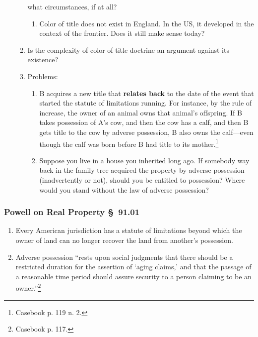 \begin{enumerate}
\begin{enumerate}
        what circumstances, if at all?
        \begin{enumerate}
            \item Color of title does not exist in England. In the US, it 
            developed in the context of the frontier. Does it still make sense 
            today?
        \end{enumerate}
        \item Is the complexity of color of title doctrine an argument against 
        its existence?
        \item Problems:
        \begin{enumerate}
            \item B acquires a new title that \textbf{relates back} to the date of 
            the event that started the statute of limitations running. For 
            instance, by the rule of increase, the owner of an animal owns that 
            animal's offspring.  If B takes possession of A's cow, and then the 
            cow has a calf, and then B  gets title to the cow by adverse 
            possession, B also owns the calf---even though the calf was born 
            before B had title to its mother.\footnote{Casebook p. 119 n. 2.}
            \item Suppose you live in a house you inherited long ago. If somebody 
            way back in the family tree acquired the property by adverse 
            possession (inadvertently or not), should you be entitled to 
            possession? Where would you stand without the law of adverse 
            possession?
        \end{enumerate}
    \end{enumerate}
\end{enumerate}

\subsubsection{Powell on Real Property \S\ 91.01}

\begin{enumerate}
    \item Every American jurisdiction has a statute of limitations beyond 
    which the owner of land can no longer recover the land from another's 
    possession.
    \item Adverse possession ``rests upon social judgments that there should 
    be a restricted duration for the assertion of `aging claims,' and that the 
    passage of a reasonable time period should assure security to a person 
    claiming to be an owner.''\footnote{Casebook p. 117.}
\end{enumerate}

